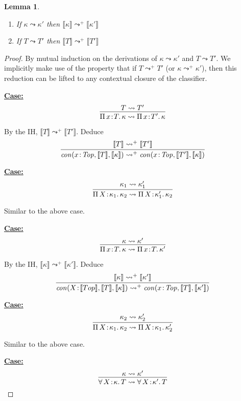 \documentclass{article}
\newcommand{\abs}[4]{{#1}\, #2\! : \! #3.\, #4}
\newcommand{\interp}[1]{\llbracket #1 \rrbracket}
\newcommand{\startcase}[1]{\vspace{#1} \noindent\textbf{\underline{Case:}}}
\newtheorem{lemma}[theorem]{Lemma}
\begin{document}
\begin{lemma}
  \label{thm:stlc-dynamic-sound}
  \
  \begin{enumerate}
  \item If \(\kappa \leadsto \kappa'\) then \(\interp{\kappa} \leadsto^+
    \interp{\kappa'}\)
    
  \item If \(T \leadsto T'\) then \(\interp{T} \leadsto^+ \interp{T'}\)
  \end{enumerate}
\end{lemma}
\begin{proof}
  By mutual induction on the derivations of \(\kappa \leadsto \kappa'\) and \(T
  \leadsto T'\).
  We implicitly make use of the property that if \(T \leadsto^+ T'\) (or
  \(\kappa \leadsto^+ \kappa'\)), then this reduction can be lifted to any
  contextual closure of the classifier.

  \startcase{.2cm}
  \[
    \infer{
      \abs{\Pi}{x}{T}{\kappa} \leadsto \abs{\Pi}{x}{T'}{\kappa}
    }{
      T \leadsto T'
    }
  \]

  By the IH, \(\interp{T} \leadsto^+ \interp{T'}\).
  Deduce
  \[
    \infer{
      \mathit{con}(x\!:\!\mathit{Top},\interp{T},\interp{\kappa})
      \leadsto^+ \mathit{con}(x\!:\!\mathit{Top},\interp{T'},\interp{\kappa})
    }{
      \interp{T} \leadsto^+ \interp{T'}
    }
  \]

  \startcase{.2cm}
  \[
    \infer{
      \abs{\Pi}{X}{\kappa_1}{\kappa_2} \leadsto \abs{\Pi}{X}{\kappa_1'}{\kappa_2}
    }{
      \kappa_1 \leadsto \kappa_1'
    }
  \]

  Similar to the above case.

  \startcase{.2cm}
  \[
    \infer{
      \abs{\Pi}{x}{T}{\kappa} \leadsto \abs{\Pi}{x}{T}{\kappa'}
    }{
      \kappa \leadsto \kappa'
    }
  \]

  By the IH, \(\interp{\kappa} \leadsto^+ \interp{\kappa'}\).
  Deduce
  \[
    \infer{
      \mathit{con}(X\!:\!\interp{Top},\interp{T},\interp{\kappa})
      \leadsto^+ \mathit{con}(x\!:\!\mathit{Top},\interp{T},\interp{\kappa'})
    }{
      \interp{\kappa} \leadsto^+ \interp{\kappa'}
    }
  \]

  \startcase{.2cm}
  \[
    \infer{
      \abs{\Pi}{X}{\kappa_1}{\kappa_2} \leadsto \abs{\Pi}{X}{\kappa_1}{\kappa_2'}
    }{
      \kappa_2 \leadsto \kappa_2'
    }
  \]

  Similar to the above case.

  \startcase{.2cm}
  \[
    \infer{
      \abs{\forall}{X}{\kappa}{T} \leadsto \abs{\forall}{X}{\kappa'}{T}
    }{
      \kappa \leadsto \kappa'
    }
  \]


\end{proof}
\end{document}
